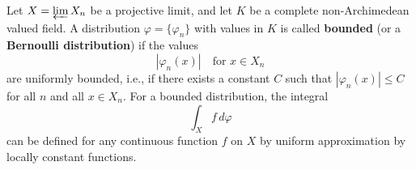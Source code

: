 Let $X = \varprojlim X_n$ be a projective limit, and let $K$ be a complete non-Archimedean valued field. A distribution $\varphi = \{\varphi_n\}$ with values in $K$ is called \textbf{bounded} (or a \textbf{Bernoulli distribution}) if the values
$$|\varphi_n(x)| \quad \text{for } x \in X_n$$
are uniformly bounded, i.e., if there exists a constant $C$ such that $|\varphi_n(x)| \leq C$ for all $n$ and all $x \in X_n$. For a bounded distribution, the integral
$$\int_X f \, d\varphi$$
can be defined for any continuous function $f$ on $X$ by uniform approximation by locally constant functions.
